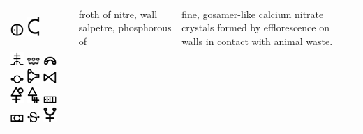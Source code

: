 \documentclass[british,final,landscape]{scrartcl}
\begin{document}
\begin{refsection}
\begin{supertabular}{p{0.3\textwidth}p{0.34\textwidth}p{0.34\textwidth}}
   \includegraphics[width=5mm]{Compounds/WallSalpetre} \includegraphics[width=5mm]{Compounds/WallSalpetre2} & froth of nitre, wall salpetre, phosphorous of  & fine, gosamer-like calcium nitrate crystals formed by efflorescence on walls in contact with animal waste. \\
   \includegraphics[width=5mm]{Compounds/WhiteArsenic} \includegraphics[width=5mm]{Compounds/WhiteArsenic2} \includegraphics[width=5mm]{Compounds/WhiteArsenic3} \includegraphics[width=5mm]{Compounds/WhiteArsenic4} \includegraphics[width=5mm]{Compounds/WhiteArsenic5} \includegraphics[width=5mm]{Compounds/WhiteArsenic6} \includegraphics[width=5mm]{Compounds/WhiteArsenic8} \includegraphics[width=5mm]{Compounds/WhiteArsenic9} \includegraphics[width=5mm]{Compounds/WhiteArsenic10} \includegraphics[width=5mm]{Compounds/WhiteArsenic11} \includegraphics[width=5mm]{Compounds/WhiteArsenic12} \includegraphics[width=5mm]{Compounds/WhiteArsenic13} 
\end{supertabular}
\end{refsection}
\end{document}
